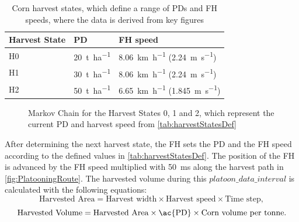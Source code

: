 \begin{table}[H]
	\centering
	\begin{tabular}{>{\centering}p{2cm}p{4cm}p{4cm}}
		\toprule
		Harvest State & \ac{PD} & \ac{FH} speed\\
		\midrule
		H0 & \SI{20}{\tonne\per\hectare}
        & \SI{8.06}{\kilo\metre\per\hour} (\SI{2.24}{\metre\per\second}) \\
		H1 & \SI{30}{\tonne\per\hectare}
        & \SI{8.06}{\kilo\metre\per\hour} (\SI{2.24}{\metre\per\second}) \\
		H2 & \SI{50}{\tonne\per\hectare}
        & \SI{6.65}{\kilo\metre\per\hour} (\SI{1.845}{\metre\per\second}) \\
		\bottomrule
	\end{tabular}
	\caption{Corn harvest states, which define a range of \acfp{PD} and \acf{FH} speeds, where the data is derived from
	key figures \cite{faustzahlen2018}}
	\label{tab:harvestStatesDef}
\end{table}

\begin{figure}[H]
\centering
{}
\caption{Markov Chain for the Harvest States 0, 1 and 2, which represent the current \ac{PD} and
harvest speed from \autoref{tab:harvestStatesDef}}
\label{fig:MarkovChain}
\end{figure}

After determining the next harvest state, the \ac{FH} sets the \ac{PD} and the \ac{FH} speed according to the defined values in
\autoref{tab:harvestStatesDef}.
The position of the \ac{FH} is advanced by the \ac{FH} speed multiplied with \SI{50}{\milli\second} along the
harvest path in \autoref{fig:PlatooningRoute}.
The harvested volume during this $platoon\_data\_interval$ is calculated with the following
equations:
\begin{equation}
   \label{eq:AreaCalculation}
   \text{Harvested Area} =
      \text{Harvest width} \times \text{Harvest speed} \times \text{Time step}
   ,
\end{equation}
\begin{equation}
   \label{eq:VolumneCalculation}
   \text{Harvested Volume} =
   \text{Harvested Area} \times \text{\ac{PD}} \times \text{Corn volume per tonne}.
\end{equation}

